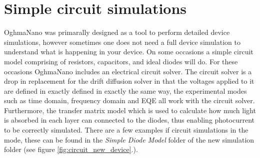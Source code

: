 \newpage
\chapter{Simple circuit simulations}
OghmaNano was primarally designed as a tool to perform detailed device simulations, however sometimes one does not need a full device simulation to understand what is happening in your device. On some occasions a simple circuit model comprising of resistors, capacitors, and ideal diodes will do. For these occasions OghmaNano includes an electrical circuit solver. The circuit solver is a drop in replacement for the drift diffusion solver in that the voltages applied to it are defined in exactly defined in exactly the same way, the experimental modes such as time domain, frequency domain and EQE all work with the circuit solver. Furthermore, the transfer matrix model which is used to calculate how much light is absorbed in each layer can connected to the diodes, thus enabling photocurrent to be correctly simulated. There are a few examples if circuit simulations in the mode, these can be found in the \emph{Simple Diode Model} folder of the new simulation folder (see figure \ref{fig:circuit_new_device}.).

